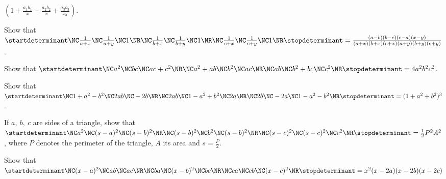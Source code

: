  $\left(1 + \frac{a_1b_1}{x} + \frac{a_2b_2}{x} + \frac{a_3b_3}{x_3}\right)$.
\item Show that $\startdeterminant\NC \frac{1}{a + x} \NC \frac{1}{a + y} \NC 1\NR\NC \frac{1}{b + x} \NC \frac{1}{b + y} \NC 1\NR\NC \frac{1}{c + x} \NC
  \frac{1}{c + y} \NC 1\NR\stopdeterminant  = \frac{(a - b)(b - c)(c - a)(x - y)}{(a + x)(b + x)(c + x)(a + y)(b + y)(c + y)}$.
\item Show that $\startdeterminant\NC  a^2 \NC bc \NC ac + c^2\NR\NC a^2 + ab \NC b^2 \NC ac\NR\NC ab \NC b^2 + bc \NC c^2\NR\stopdeterminant = 4a^2b^2c^2$.
\item Show that $\startdeterminant\NC 1 + a^2 - b^2 \NC 2ab \NC -2b\NR\NC 2ab \NC 1 - a^2 + b^2 \NC 2a\NR\NC 2b \NC -2a \NC 1 - a^2 - b^2\NR\stopdeterminant = (1 +
  a^2 + b^2)^3$.
\item If $a,\ b,\ c$ are sides of a triangle, show that $\startdeterminant\NC  a^2 \NC (s - a)^2 \NC (s - b)^2\NR\NC (s - b)^2 \NC b^2 \NC (s -
  b)^2\NR\NC (s - c)^2 \NC (s - c)^2 \NC c^2\NR\stopdeterminant = \frac{1}{2}P^2A^2$, where $P$ denotes the perimeter of the triangle, $A$ its
  area and $s = \frac{P}{2}$.
\item Show that $\startdeterminant\NC (x - a)^2 \NC ab \NC ac\NR\NC ba \NC (x - b)^2 \NC bc\NR\NC ca \NC cb \NC (x - c)^2\NR\stopdeterminant = x^2(x - 2a)(x - 2b)(x
  - 2c)$


